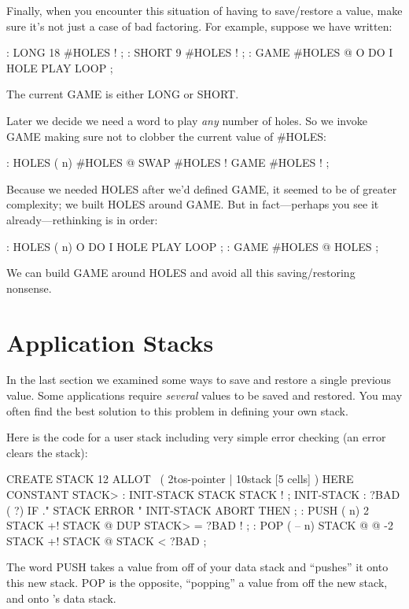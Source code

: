 Finally, when you encounter this situation of having to save/restore a
value, make sure it's not just a case of bad factoring. For example,
suppose we have written:

\begin{Code}
: LONG   18 #HOLES ! ;
: SHORT   9 #HOLES ! ;
: GAME   #HOLES @  O DO  I HOLE PLAY  LOOP ;
\end{Code}
The current GAME is either LONG or SHORT.

Later we decide we need a word to play \emph{any} number of holes. So we
invoke GAME making sure not to clobber the current value of \#HOLES:

\begin{Code}
: HOLES  ( n)  #HOLES @  SWAP #HOLES !  GAME  #HOLES ! ;
\end{Code}
Because we needed HOLES after we'd defined GAME, it seemed to be of
greater complexity; we built HOLES around GAME. But in fact---perhaps
you see it already---rethinking is in order:

\begin{Code}
: HOLES ( n)  O DO  I HOLE PLAY  LOOP ;
: GAME   #HOLES @ HOLES ;
\end{Code}
We can build GAME around HOLES and avoid all this saving/restoring
nonsense.

\section{Application Stacks}

In the last section we examined some ways to save and restore a single
previous value. Some applications require \emph{several} values to be saved and
restored. You may often find the best solution to this problem in defining
your own stack.

Here is the code for a user stack including very simple error checking
(an error clears the stack):

\begin{Code}
CREATE STACK  12 ALLOT  \  ( 2tos-pointer | 10stack [5 cells] )
HERE CONSTANT STACK>
: INIT-STACK   STACK STACK ! ;   INIT-STACK
: ?BAD  ( ?)   IF ." STACK ERROR "  INIT-STACK  ABORT  THEN ;
: PUSH  ( n)   2 STACK +!  STACK @  DUP  STACK> = ?BAD  ! ;
: POP  ( -- n)  STACK @ @  -2 STACK +!  STACK @ STACK < ?BAD ;
\end{Code}
The word PUSH takes a value from off of your data stack and ``pushes''
it onto this new stack. POP is the opposite, ``popping'' a value from off
the new stack, and onto \Forth{}'s data stack.

